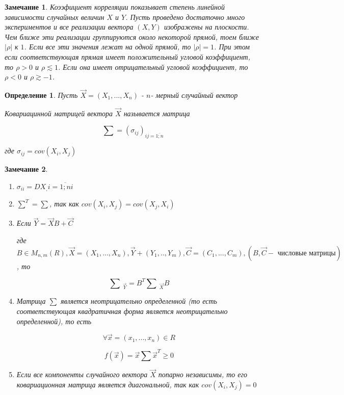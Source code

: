 \documentclass[a4paper, 14pt]{report}
\newtheorem{defenition}{Определение}[section]
\newtheorem{note}{Замечание}[section]
\begin{document}
\begin{note}
    Коээфициент корреляции показывает степень линейной зависимости случайных величин $X$ и $Y$. Пусть проведено достаточно много экспериментов и все реализации вектора $(X,Y)$ изображены на плоскости. Чем ближе эти реализации группируются около некоторой прямой, тоем ближе $|\rho|$ к $1$. Если все эти значения лежат на одной прямой, то $|\rho| = 1$. При этом если соответствующая прямая имеет положительный угловой коэффициент, то $\rho > 0$ и $\rho \lesssim 1$. Если она имеет отрицательный угловой коэффициент, то $\rho < 0$ и $\rho \gtrsim -1$.
\end{note}

\begin{defenition}
    Пусть $\vec X = (X_1, ..., X_n)$ - $n$- мерный случайный вектор

    Ковариацинной матрицей вектора $\vec X$ называется матрица

    $$
    \sum = (\sigma_{ij})_{ij=\overline{1;n}}
    $$

    где $\sigma_{ij} = cov(X_i, X_j)$
\end{defenition}

\begin{note}
    \begin{enumerate}
        \item $\sigma_{ii} = DX_, i = \overline{1;n}i$
        \item $\sum^T = \sum$, так как $cov(X_i, X_j) = cov(X_j, X_i)$
        \item Если $\vec Y = \vec X B + \vec C$

            где $B \in M_{n,m}(R), \vec X = (X_1, ..., X_n), \vec Y + (Y_1, .., Y_m), \vec C = (C_1, ..., C_m), (B, \vec C - \text{ числовые матрицы})$, то

            $$
            \sum\ _{\vec Y} = B^T \sum\ _{\vec X} B
            $$

        \item Матрица $\sum$ является неотрицательно определенной (то есть соответствующая квадратичная форма является неотрицательно определенной), то есть

            $$
            \forall \vec x = (x_1, ..., x_n) \in R
            $$

            $$
            f(\vec x) = \vec x \sum \vec x^T \geq 0
            $$

        \item Если все компоненты случайного вектора $\vec X$ попарно независимы, то его ковариационная матрица является диагональной, так как $cov(X_i, X_j) = 0$
    \end{enumerate}
\end{note}
\end{document}
